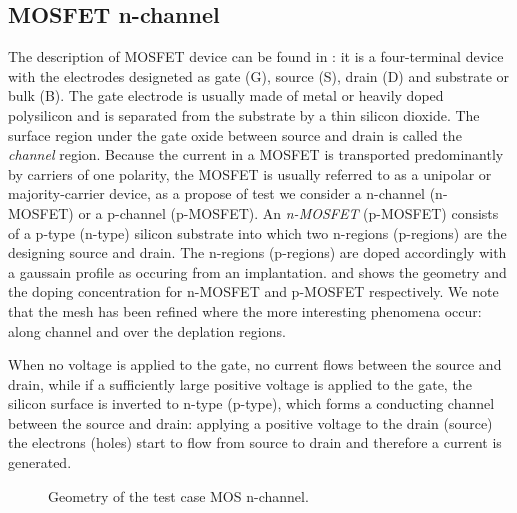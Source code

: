 \clearpage





\subsection{MOSFET n-channel}
\label{sec: MOS}


The description of MOSFET device can be found in \cite{ModernVLSIdevices}: it is a four-terminal device with the electrodes designeted as gate (G), source (S), drain (D) and substrate or bulk (B). The gate electrode is usually made of metal or heavily doped polysilicon and is separated from the substrate by a thin silicon dioxide. The surface region under the gate  oxide between source and drain is called the \textit{channel} region.
Because the current in a MOSFET is transported predominantly by carriers of one polarity, the MOSFET is usually referred to as a unipolar or majority-carrier device, as a propose of test we consider a n-channel (n-MOSFET) or a p-channel (p-MOSFET). An \textit{n-MOSFET} (p-MOSFET) consists of a p-type (n-type) silicon substrate into which two n-regions (p-regions) are the designing source and drain. The n-regions (p-regions) are doped accordingly with a gaussain profile as occuring from an implantation. 
 and  shows the geometry and the doping concentration for n-MOSFET and p-MOSFET respectively. 
We note that the mesh has been refined where the more interesting phenomena occur: along channel and over the deplation regions.

When no voltage is applied to the gate, no current flows between the source and drain, while if a sufficiently large positive voltage is applied to the gate, the silicon surface is inverted to n-type (p-type), which forms a conducting channel between the source and drain: applying a positive voltage to the drain (source) the electrons (holes) start to flow from source to drain and therefore a current is generated. 

\begin{figure}[!b]
\centering
{}
\hspace{0.5cm}
\caption{Geometry of the test case MOS n-channel.}
\label{fig: mos geometry}
\end{figure}




